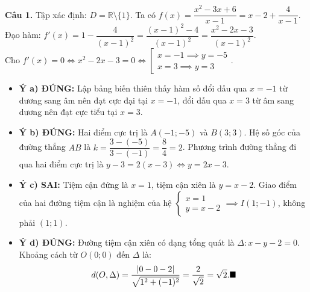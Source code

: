 \documentclass[12pt,a4paper]{article}
\begin{document}
\noindent\textbf{Câu 1.}
Tập xác định: $D = \mathbb{R} \setminus \{1\}$. Ta có $f(x) = \dfrac{x^2 - 3x + 6}{x - 1} = x - 2 + \dfrac{4}{x - 1}$.\\
Đạo hàm: $f'(x) = 1 - \dfrac{4}{(x - 1)^2} = \dfrac{(x - 1)^2 - 4}{(x - 1)^2} = \dfrac{x^2 - 2x - 3}{(x - 1)^2}$.\\
Cho $f'(x) = 0 \iff x^2 - 2x - 3 = 0 \iff \left[\begin{array}{l} x = -1 \implies y = -5 \\ x = 3 \implies y = 3 \end{array}\right.$.
\begin{itemize}[leftmargin=*]
    \item \textbf{Ý a) ĐÚNG:} Lập bảng biến thiên thấy hàm số đổi dấu qua $x = -1$ từ dương sang âm nên đạt cực đại tại $x = -1$, đổi dấu qua $x = 3$ từ âm sang dương nên đạt cực tiểu tại $x = 3$.
    \item \textbf{Ý b) ĐÚNG:} Hai điểm cực trị là $A(-1; -5)$ và $B(3; 3)$. Hệ số góc của đường thẳng $AB$ là $k = \dfrac{3 - (-5)}{3 - (-1)} = \dfrac{8}{4} = 2$. Phương trình đường thẳng đi qua hai điểm cực trị là $y - 3 = 2(x - 3) \iff y = 2x - 3$.
    \item \textbf{Ý c) SAI:} Tiệm cận đứng là $x = 1$, tiệm cận xiên là $y = x - 2$. Giao điểm của hai đường tiệm cận là nghiệm của hệ $\begin{cases} x = 1 \\ y = x - 2 \end{cases} \implies I(1; -1)$, không phải $(1; 1)$.
    \item \textbf{Ý d) ĐÚNG:} Đường tiệm cận xiên có dạng tổng quát là $\Delta: x - y - 2 = 0$. Khoảng cách từ $O(0; 0)$ đến $\Delta$ là:
    $$d(O, \Delta) = \dfrac{|0 - 0 - 2|}{\sqrt{1^2 + (-1)^2}} = \dfrac{2}{\sqrt{2}} = \sqrt{2}.\hfill\blacksquare$$
\end{itemize}
\end{document}
